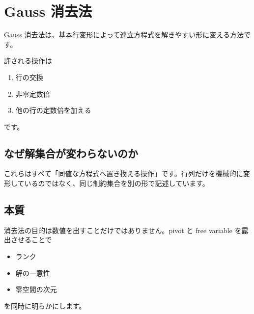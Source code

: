 \documentclass[
  11pt,
  a4paper,
]{ltjsarticle}
\author{}
\date{}
\providecommand{\tightlist}{%
  \setlength{\itemsep}{0pt}\setlength{\parskip}{0pt}}
\begin{document}
\hypertarget{gauss-ux6d88ux53bbux6cd5}{%
\section{Gauss 消去法}\label{gauss-ux6d88ux53bbux6cd5}}

Gauss
消去法は、基本行変形によって連立方程式を解きやすい形に変える方法です。

許される操作は

\begin{enumerate}
\def\labelenumi{\arabic{enumi}.}
\tightlist
\item
  行の交換
\item
  非零定数倍
\item
  他の行の定数倍を加える
\end{enumerate}

です。

\hypertarget{ux306aux305cux89e3ux96c6ux5408ux304cux5909ux308fux3089ux306aux3044ux306eux304b}{%
\subsection{なぜ解集合が変わらないのか}\label{ux306aux305cux89e3ux96c6ux5408ux304cux5909ux308fux3089ux306aux3044ux306eux304b}}

これらはすべて「同値な方程式へ置き換える操作」です。行列だけを機械的に変形しているのではなく、同じ制約集合を別の形で記述しています。

\hypertarget{ux672cux8cea}{%
\subsection{本質}\label{ux672cux8cea}}

消去法の目的は数値を出すことだけではありません。pivot と free variable
を露出させることで

\begin{itemize}
\tightlist
\item
  ランク
\item
  解の一意性
\item
  零空間の次元
\end{itemize}

を同時に明らかにします。
\end{document}
